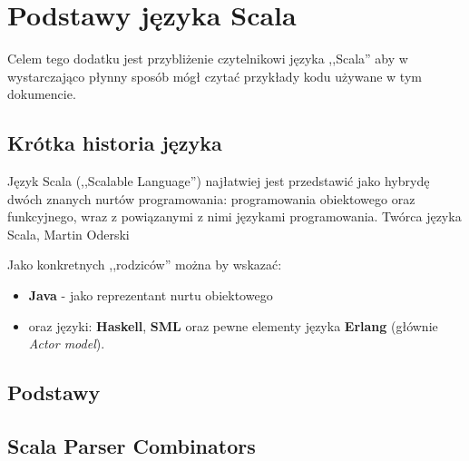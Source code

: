 \chapter{Podstawy języka Scala}
\label{cha:appendixA}
Celem tego dodatku jest przybliżenie czytelnikowi języka ,,Scala'' aby w wystarczająco płynny sposób mógł czytać przykłady kodu używane w tym dokumencie.

\section{Krótka historia języka}
\label{sec:scala_history}
Język Scala (,,Scalable Language'') najłatwiej jest przedstawić jako hybrydę dwóch znanych nurtów programowania: programowania obiektowego oraz funkcyjnego, wraz z 
powiązanymi z nimi językami programowania. Twórca języka Scala, Martin Oderski\cite{odersky_scala}

Jako konkretnych ,,rodziców'' można by wskazać: 
\begin{itemize}
 \item \textbf{Java} - jako reprezentant nurtu obiektowego 
 \item oraz języki: \textbf{Haskell}, \textbf{SML} oraz pewne elementy języka \textbf{Erlang} (głównie \textit{Actor model}).
\end{itemize}


\section{Podstawy}
\label{sec:scala_basics}

\section{Scala Parser Combinators}
\label{sec:scala_parser_combinators}
